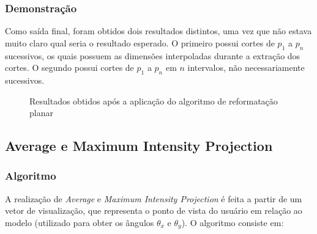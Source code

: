         \subsubsection{Demonstração}
            Como saída final, foram obtidos dois resultados distintos, uma vez que não estava muito claro qual seria o resultado esperado. O primeiro possui cortes de $p_1$ a $p_n$ sucessivos, os quais possuem as dimensões interpoladas durante a extração dos cortes. O segundo possui cortes de $p_1$ a $p_n$ em $n$ intervalos, não necessariamente sucessivos.

            \begin{figure}[!ht]
                \centering
                \hfill
                \caption{Resultados obtidos após a aplicação do algoritmo de reformatação planar}
            \end{figure}

    \subsection{Average e Maximum Intensity Projection}
        \subsubsection{Algoritmo}
            A realização de \textit{Average} e \textit{Maximum Intensity Projection} é feita a partir de um vetor de visualização, que representa o ponto de vista do usuário em relação ao modelo (utilizado para obter os ângulos $\theta_x$ e $\theta_y$). O algoritmo consiste em:

